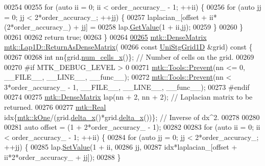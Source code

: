 \begin{DoxyCode}
00254 
00255   \textcolor{keywordflow}{for} (\textcolor{keyword}{auto} ii = 0; ii < order\_accuracy\_ - 1; ++ii) \{
00256     \textcolor{keywordflow}{for} (\textcolor{keyword}{auto} jj = 0; jj < 2*order\_accuracy\_; ++jj) \{
00257       laplacian\_[offset + ii*(2*order\_accuracy\_) + jj] =
00258         lap.\hyperlink{classmtk_1_1DenseMatrix_a4b23ecbebd970b5eea915dbb50691024}{GetValue}(1 + ii,jj);
00259     \}
00260   \}
00261 
00262   \textcolor{keywordflow}{return} \textcolor{keyword}{true};
00263 \}
00264 
\hypertarget{mtk__lap__1d_8cc_source_l00265}{}\hyperlink{classmtk_1_1Lap1D_aaea34a17b0879e05eb4109645a2ba8f4}{00265} \hyperlink{classmtk_1_1DenseMatrix}{mtk::DenseMatrix} \hyperlink{classmtk_1_1Lap1D_aaea34a17b0879e05eb4109645a2ba8f4}{mtk::Lap1D::ReturnAsDenseMatrix}(
00266   \textcolor{keyword}{const} \hyperlink{classmtk_1_1UniStgGrid1D}{UniStgGrid1D} &grid)\textcolor{keyword}{ const }\{
00267 
00268   \textcolor{keywordtype}{int} nn\{grid.\hyperlink{classmtk_1_1UniStgGrid1D_af1b3729d8afa07be5b2775ed68015b80}{num\_cells\_x}()\};  \textcolor{comment}{// Number of cells on the grid.}
00269 
00270 \textcolor{preprocessor}{  #if MTK\_DEBUG\_LEVEL > 0}
00271   \hyperlink{classmtk_1_1Tools_a332324c6f25e66be9dff48c5987a3b9f}{mtk::Tools::Prevent}(nn <= 0, \_\_FILE\_\_, \_\_LINE\_\_, \_\_func\_\_);
00272   \hyperlink{classmtk_1_1Tools_a332324c6f25e66be9dff48c5987a3b9f}{mtk::Tools::Prevent}(nn < 3*order\_accuracy\_ - 1, \_\_FILE\_\_, \_\_LINE\_\_, \_\_func\_\_);
00273 \textcolor{preprocessor}{  #endif}
00274 
00275   \hyperlink{classmtk_1_1DenseMatrix}{mtk::DenseMatrix} lap(nn + 2, nn + 2); \textcolor{comment}{// Laplacian matrix to be returned.}
00276 
00277   \hyperlink{group__c01-roots_gac080bbbf5cbb5502c9f00405f894857d}{mtk::Real} idx\{\hyperlink{group__c01-roots_ga26407c24d43b6b95480943340d285c71}{mtk::kOne}/(grid.\hyperlink{classmtk_1_1UniStgGrid1D_a6e7173b01241632cf509496d66b9f74c}{delta\_x}()*grid.\hyperlink{classmtk_1_1UniStgGrid1D_a6e7173b01241632cf509496d66b9f74c}{delta\_x}())\}; \textcolor{comment}{// Inverse of
       dx^2.}
00278 
00280 
00281   \textcolor{keyword}{auto} offset = (1 + 2*order\_accuracy\_ - 1);
00282 
00283   \textcolor{keywordflow}{for} (\textcolor{keyword}{auto} ii = 0; ii < order\_accuracy\_ - 1; ++ii) \{
00284     \textcolor{keywordflow}{for} (\textcolor{keyword}{auto} jj = 0; jj < 2*order\_accuracy\_; ++jj) \{
00285       lap.\hyperlink{classmtk_1_1DenseMatrix_a784ce5784109ac86bfb9d8562b334b13}{SetValue}(1 + ii,
00286                    jj,
00287                    idx*laplacian\_[offset + ii*2*order\_accuracy\_ + jj]);
00288     \}

\end{DoxyCode}
